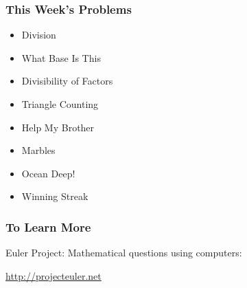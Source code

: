 \documentclass{beamer}
\begin{document}
\begin{frame}
  \frametitle{This Week's Problems}
  {\smaller
  \begin{itemize}
  \item Division
  \item What Base Is This
  \item Divisibility of Factors
  \item Triangle Counting
  \item Help My Brother
  \item Marbles
  \item Ocean Deep!
  \item Winning Streak
  \end{itemize}}
\end{frame}

\begin{frame}
  \frametitle{To Learn More}

  Euler Project: Mathematical questions using computers:

  \url{http://projecteuler.net}
\end{frame}
\end{document}
